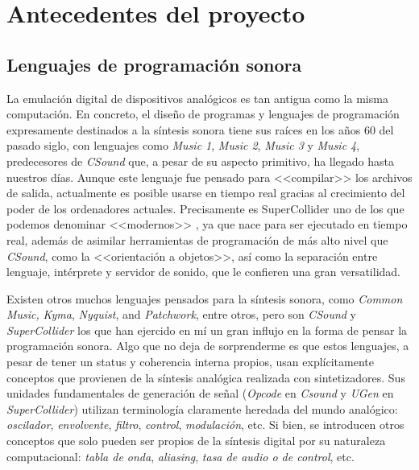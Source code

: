 \chapter[Antecedentes del proyecto]{Antecedentes del proyecto}

\section{Lenguajes de programación sonora}

La emulación digital de dispositivos analógicos es tan antigua como la misma computación. En concreto, el diseño de programas y lenguajes de programación expresamente destinados a la síntesis sonora tiene sus raíces  en los años 60 del pasado siglo, con lenguajes como \textit{Music 1}, \textit{Music 2}, \textit{Music 3} y \textit{Music 4}, predecesores de \textit{CSound} \cite[~p. xxvii]{Csound_book} que, a pesar de su aspecto primitivo, ha llegado hasta nuestros días. Aunque este lenguaje fue pensado para <<compilar>> los archivos de salida, actualmente es posible usarse en tiempo real gracias al crecimiento del poder de los ordenadores actuales. Precisamente es SuperCollider uno de los que podemos denominar <<modernos>> \cite[~p. ix]{SC_book}, ya que nace para ser ejecutado en tiempo real, además de asimilar herramientas de programación de más alto nivel que \textit{CSound}, como la <<orientación a objetos>>, así como la separación entre lenguaje, intérprete y servidor de sonido, que le confieren una gran versatilidad. 

Existen otros muchos lenguajes pensados para la síntesis sonora, como \textit{Common Music,} \textit{Kyma}, \textit{Nyquist}, and \textit{Patchwork}, entre otros, pero son \textit{CSound} y \textit{SuperCollider} los que han ejercido en mí un gran influjo en la forma de pensar la programación sonora. Algo que no deja de sorprenderme es que estos lenguajes, a pesar de tener un status y coherencia interna propios, usan explícitamente conceptos que provienen de la síntesis analógica realizada con sintetizadores. Sus unidades fundamentales de generación de señal (\textit{Opcode} en \textit{Csound} y \textit{UGen} en \textit{SuperCollider}) utilizan terminología claramente heredada del mundo analógico: \textit{oscilador}, \textit{envolvente}, \textit{filtro}, \textit{control}, \textit{modulación}, etc. Si bien, se introducen otros conceptos que solo pueden ser propios de la síntesis digital por su naturaleza computacional: \textit{tabla de onda}, \textit{aliasing}, \textit{tasa de audio o de control}, etc.

